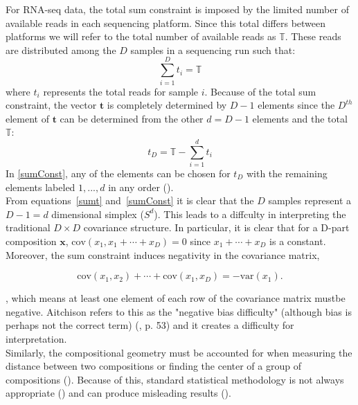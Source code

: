 \documentclass{article}\usepackage[]{graphicx}\usepackage[]{color}
\begin{document}
For RNA-seq data, the total sum constraint is imposed by the limited number of available reads in each sequencing platform.  Since this total differs between platforms we will refer to the total number of available reads as $\mathbb{T}$. These reads are distributed among the $D$ samples in a sequencing run such that:
\begin{equation}
\sum_{i=1}^{D} t_i = \mathbb{T}
\label{sumt}
\end{equation}
where $t_i$ represents the total reads for sample $i$.  Because of the total sum constraint, the vector $\mathbf{t}$ is completely determined by $D-1$ elements since the $D^{th}$ element of $\mathbf{t}$ can be determined from the other $d = D-1$ elements and the total $\mathbb{T}$:  
\begin{equation}
t_D = \mathbb{T} - \sum_{i=1}^{d} t_i
\label{sumConst}
\end{equation}
In \ref{sumConst}, any of the elements can be chosen for $t_D$ with the remaining elements labeled $1, ..., d$ in any order (\cite{Aitchison1986}).  \\

From equations~\ref{sumt} and~\ref{sumConst} it is clear that the $D$ samples represent a $D - 1 = d$ dimensional simplex ($S^d$). This leads to a diffculty in interpreting the traditional $D \times D$ covariance structure.  In particular, it is clear that for a D-part composition $\mathbf{x}$, $\text{cov}(x_1, x_1+ \cdots +x_D) = 0$  since $x_1 + \cdots + x_D$ is a constant.  Moreover, the sum constraint induces negativity in the covariance matrix,

\begin{equation}
\text{cov}(x_1, x_2) + \cdots + \text{cov}(x_1, x_D) = -\text{var}(x_1).
\label{negbias}
\end{equation}

, which means at least one element of each row of the covariance matrix mustbe negative. Aitchison refers to this as the "negative bias difficulty" (although bias is perhaps not the correct term) (\cite{Aitchison1986}, p. 53) and it creates a difficulty for interpretation.  \\

Similarly, the compositional geometry must be accounted for when measuring the distance between two compositions or finding the center of a group of compositions (\cite{Aitchison2000}).  Because of this, standard statistical methodology is not always appropriate (\cite{Aitchison1986}) and can produce misleading results (\cite{Lovell2015}).\\
\end{document}
